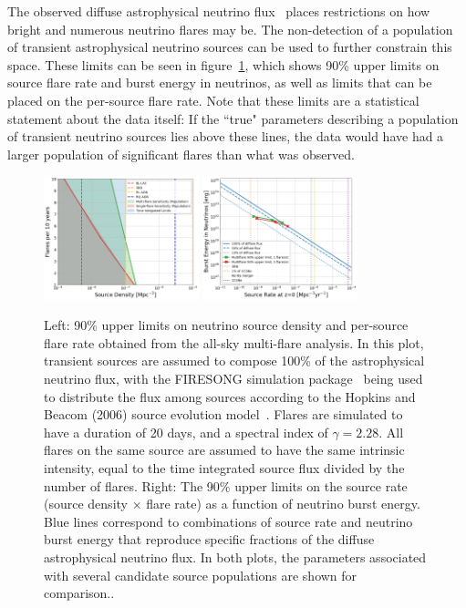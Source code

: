 The observed diffuse astrophysical neutrino flux~\cite{stettner2019measurement} places restrictions on how bright and numerous neutrino flares may be. The non-detection of a population of transient astrophysical neutrino sources can be used to further constrain this space. These limits can be seen in figure~\ref{fig:mfskylim}, which shows 90\% upper limits on source flare rate and burst energy in neutrinos, as well as limits that can be placed on the per-source flare rate. Note that these limits are a statistical statement about the data itself: If the ``true" parameters describing a population of transient neutrino sources lies above these lines, the data would have had a larger population of significant flares than what was observed. 

\begin{figure}[h]
\centering
\includegraphics[width=0.4\textwidth]{figs/flarelims.png}
\includegraphics[width=0.4\textwidth]{figs/sourceratelims.png}
\caption{Left: 90\% upper limits on neutrino source density and per-source flare rate obtained from the all-sky multi-flare analysis. In this plot, transient sources are assumed to compose 100\% of the astrophysical neutrino flux, with the FIRESONG simulation package~\cite{firesong_ref} being used to distribute the flux among sources according to the Hopkins and Beacom (2006) source evolution model~\cite{Hopkins_2006}. Flares are simulated to have a duration of 20 days, and a spectral index of $\gamma=2.28$. All flares on the same source are assumed to have the same intrinsic intensity, equal to the time integrated source flux divided by the number of flares. Right: The 90\% upper limits on the source rate (source density $\times$ flare rate) as a function of neutrino burst energy. Blue lines correspond to combinations of source rate and neutrino burst energy that reproduce specific fractions of the diffuse astrophysical neutrino flux. In both plots, the parameters associated with several candidate source populations are shown for comparison..}
\label{fig:mfskylim}
\end{figure}


